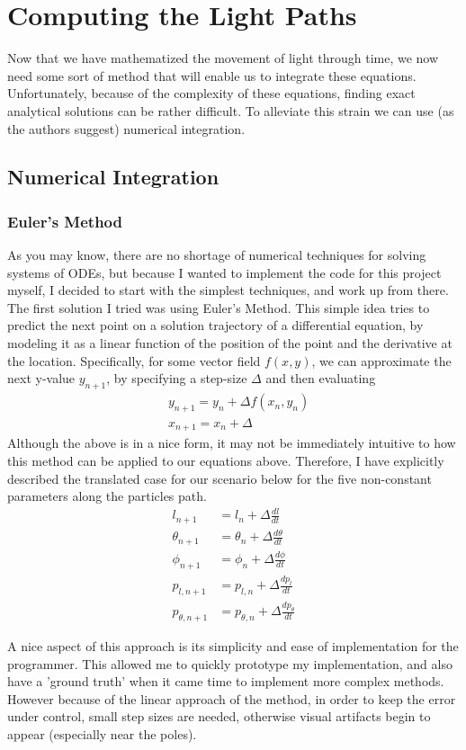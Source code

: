 \documentclass{article}
\begin{document}
\section{Computing the Light Paths}
Now that we have mathematized the movement of light through time, we now need some sort of method that will enable us to integrate these equations. Unfortunately, because of the complexity of these equations, finding exact analytical solutions can be rather difficult. To alleviate this strain we can use (as the authors suggest) numerical integration.
\subsection{Numerical Integration}
\subsubsection{Euler's Method}
As you may know, there are no shortage of numerical techniques for solving systems of ODEs, but because I wanted to implement the code for this project myself, I decided to start with the simplest techniques, and work up from there. The first solution I tried was using Euler's Method. This simple idea tries to predict the next point on a solution trajectory of a differential equation, by modeling it as a linear function of the position of the point and the derivative at the location. Specifically, for some vector field $f(x,y)$, we can approximate the next y-value $y_{n+1}$, by specifying a step-size $\Delta$ and then evaluating
\begin{align*}
&\boxed{y_{n+1}=y_{n}+\Delta f(x_n,y_n)}\\
&x_{n+1} = x_n + \Delta
\end{align*}
Although the above is in a nice form, it may not be immediately intuitive to how this method can be applied to our equations above. Therefore, I have explicitly described the translated case for our scenario below for the five non-constant parameters along the particles path.
\begin{align*}
l_{n+1}&=l_{n}+\Delta\frac{d l}{d t}\\
\theta_{n+1}&=\theta_{n}+\Delta\frac{d \theta}{d t}\\
\phi_{n+1}&=\phi_{n}+\Delta\frac{d \phi}{d t}\\
p_{l,n+1}&=p_{l,n}+\Delta\frac{d p_{l}}{d t}\\
p_{\theta,n+1}&=p_{\theta,n}+\Delta\frac{d p_{\theta}}{d t}
\end{align*}
\par A nice aspect of this approach is its simplicity and ease of implementation for the programmer. This allowed me to quickly prototype my implementation, and also have a 'ground truth' when it came time to implement more complex methods. However because of the linear approach of the method, in order to keep the error under control, small step sizes are needed, otherwise visual artifacts begin to appear (especially near the poles).
\end{document}
